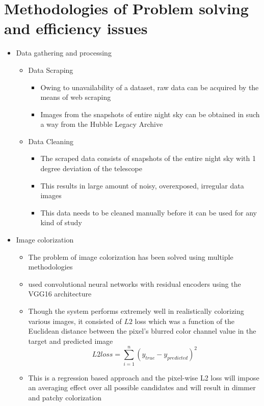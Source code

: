 \documentclass[oneside,a4paper,12pt]{report}
\begin{document}
\section{Methodologies of Problem solving and efficiency issues}
\begin{itemize}
	\item Data gathering and processing
	\begin{itemize}
	\item Data Scraping
		\begin{itemize}
		\item Owing to unavailability of a dataset, raw data can be acquired by the means of web scraping 
		\item Images from the snapshots of entire night sky can be obtained in such a way from the Hubble Legacy Archive
		\end{itemize}
	\item Data Cleaning
		\begin{itemize}
		\item The scraped data consists of snapshots of the entire night sky with 1 degree deviation of the telescope
		\item This results in large amount of noisy, overexposed, irregular data images
		\item This data needs to be cleaned manually before it can be used for any kind of study
		\end{itemize}
	\end{itemize}
	\item Image colorization 
	\begin{itemize}
		\item The problem of image colorization has been solved using multiple methodologies
		\item \cite{dahl2016automatic} used convolutional neural networks with residual encoders using the VGG16 architecture
		\item Though the system performs extremely well in realistically colorizing various images, it consisted of $L2$ loss which was a function of the Euclidean distance between the pixel's blurred color channel value in the target and predicted image
		\begin{equation}
			L2 loss = \sum_{i=1}^n(y_{true} - y_{predicted})^2
		\end{equation}
		\item This is a regression based approach and the pixel-wise L2 loss will impose an averaging effect over all possible candidates and will result in dimmer and patchy colorization 

\end{itemize}
\end{itemize}
\end{document}
